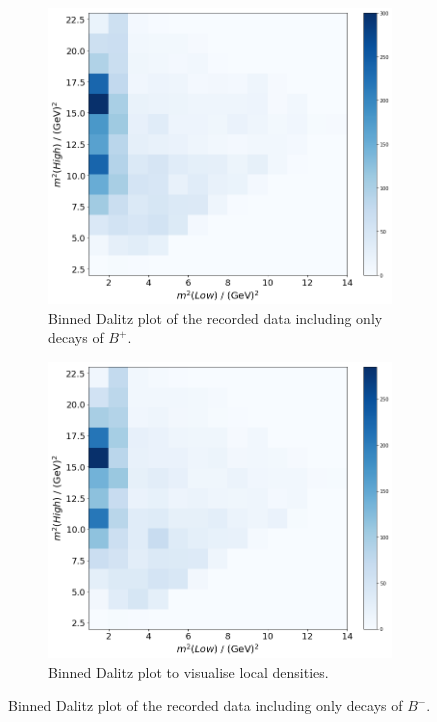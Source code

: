 \begin{figure}
  \centering
  \begin{subfigure}[b]{0.45\textwidth}
      \centering
      \includegraphics[width=\textwidth]{"content/pics/binned_dalitz_no_charm_p.png"}
      \caption{Binned Dalitz plot of the recorded data including only decays of $B^+$.}
  \end{subfigure}
  \hfill
  \begin{subfigure}[b]{0.45\textwidth}
      \centering
      \includegraphics[width=\textwidth]{"content/pics/binned_dalitz_no_charm_m.png"}
      \caption{Binned Dalitz plot to visualise local densities.}
  \end{subfigure}
     \caption{Binned Dalitz plot of the recorded data including only decays of $B^-$.}
     \label{fig:binned_dalitz_no_charm}
\end{figure}
